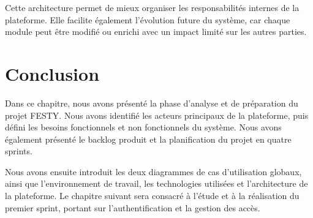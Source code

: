 Cette architecture permet de mieux organiser les responsabilités internes de la plateforme. Elle facilite également l’évolution future du système, car chaque module peut être modifié ou enrichi avec un impact limité sur les autres parties.


\section{Conclusion}


Dans ce chapitre, nous avons présenté la phase d’analyse et de préparation du projet FESTY. Nous avons identifié les acteurs principaux de la plateforme, puis défini les besoins fonctionnels et non fonctionnels du système. Nous avons également présenté le backlog produit et la planification du projet en quatre sprints.


Nous avons ensuite introduit les deux diagrammes de cas d’utilisation globaux, ainsi que l’environnement de travail, les technologies utilisées et l’architecture de la plateforme. Le chapitre suivant sera consacré à l’étude et à la réalisation du premier sprint, portant sur l’authentification et la gestion des accès.


